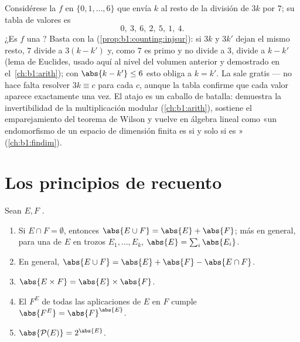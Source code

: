\begin{example}\label{ex:b1:counting:mod7}
Considérese la  $f$ en $\{0, 1, \dots, 6\}$ que envía $k$ al
resto de la división de $3k$ por $7$; su tabla de valores es
\[
0,\ 3,\ 6,\ 2,\ 5,\ 1,\ 4 .
\]
¿Es $f$ una ? Basta con la 
(\cref{prop:b1:counting:injsur}): si $3k$ y $3k'$ dejan el mismo resto,
$7$ divide a $3(k - k')$ y, como $7$ es primo y no divide a $3$, divide
a $k - k'$ (lema de Euclides, usado aquí al nivel del volumen anterior y
demostrado en el~\cref{ch:b1:arith}); con $\abs{k - k'} \leq 6$ esto
obliga a $k = k'$. La  sale gratis --- no hace falta
resolver $3k \equiv c$ para cada $c$, aunque la tabla confirme que cada
valor aparece exactamente una vez. El atajo es un caballo de batalla:
demuestra la invertibilidad de la multiplicación modular
(\cref{ch:b1:arith}), sostiene el emparejamiento del teorema de Wilson
y vuelve en álgebra lineal como «un endomorfismo de un espacio de
dimensión finita es  si y solo si es »
(\cref{ch:b1:findim}).
\end{example}

\section{Los principios de recuento}

\begin{proposition}\label{prop:b1:counting:rules}
Sean $E, F$ .
\begin{enumerate}
  \item Si $E \cap F = \emptyset$, entonces $\abs{E \cup F} = \abs{E} +
        \abs{F}$; más en general, para una  de $E$ en trozos
        $E_1, \dots, E_k$, $\abs{E} = \sum_i \abs{E_i}$.
  \item En general, $\abs{E \cup F} = \abs{E} + \abs{F} - \abs{E \cap
        F}$.
  \item $\abs{E \times F} = \abs{E} \times \abs{F}$.
  \item El  $F^E$ de todas las aplicaciones de $E$ en $F$
        cumple $\abs{F^E} = \abs{F}^{\abs{E}}$.
  \item $\abs{\mathcal{P}(E)} = 2^{\abs{E}}$.
\end{enumerate}
\end{proposition}

